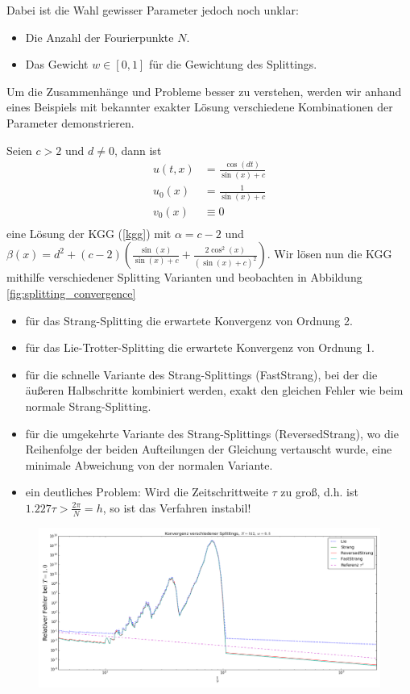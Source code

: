 Dabei ist die Wahl gewisser Parameter jedoch noch unklar:
\begin{itemize}
\item Die Anzahl der Fourierpunkte $N$.
\item Das Gewicht $w\in[0,1]$ für die Gewichtung des Splittings. 
\end{itemize}
Um die Zusammenhänge und Probleme besser zu verstehen, werden wir anhand eines Beispiels mit bekannter exakter Lösung verschiedene Kombinationen der Parameter demonstrieren.
\begin{mathbsp}
\label{bsp:trialfrog2}
Seien $c>2$ und $d\neq 0$, dann ist
\begin{align*}
u(t,x)&=\frac{\cos(dt)}{\sin(x)+c}\\
u_0(x)&=\frac{1}{\sin(x)+c}\\
v_0(x)&\equiv 0\\
\end{align*}
eine Lösung der KGG (\ref{kgg}) mit $\alpha=c-2$ und $\beta(x)=d^2+(c-2)\left(\frac{\sin(x)}{\sin(x)+c}+\frac{2\cos^2(x)}{(\sin(x)+c)^2}\right)$. Wir lösen nun die KGG mithilfe verschiedener Splitting Varianten und beobachten in Abbildung \ref{fig:splitting_convergence}
\begin{itemize}
\item für das Strang-Splitting die erwartete Konvergenz von Ordnung 2.
\item für das Lie-Trotter-Splitting die erwartete Konvergenz von Ordnung 1.
\item für die schnelle Variante des Strang-Splittings (FastStrang), bei der die äußeren Halbschritte kombiniert werden, exakt den gleichen Fehler wie beim normale Strang-Splitting.
\item für die umgekehrte Variante des Strang-Splittings (ReversedStrang), wo die Reihenfolge der beiden Aufteilungen der Gleichung vertauscht wurde, eine minimale Abweichung von der normalen Variante.
\item ein deutliches Problem: Wird die Zeitschrittweite $\tau$ zu groß, d.h. ist $1.227\tau>\frac{2\pi}{N}=h$, so ist das Verfahren instabil!
\end{itemize}
\begin{figure}[!htb]
\includegraphics[width=\textwidth]{Figures/splitting_convergence_fix_weight_frog2_cfl.png}

\end{figure}
\end{mathbsp}

